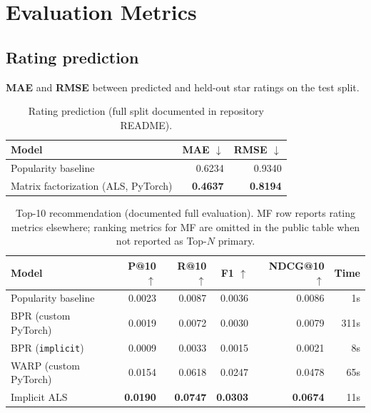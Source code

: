 \documentclass[sigconf,nonacm]{acmart}
\begin{document}
\section{Evaluation Metrics}
\label{sec:metrics}
\subsection{Rating prediction}
\textbf{MAE} and \textbf{RMSE} between predicted and held-out star ratings on the test split.

\begin{table}[t]
  \caption{Rating prediction (full split documented in repository README).}
  \label{tab:rating}
  \centering
  \begin{tabular}{lrr}
    \toprule
    Model & MAE $\downarrow$ & RMSE $\downarrow$ \\
    \midrule
    Popularity baseline & 0.6234 & 0.9340 \\
    Matrix factorization (ALS, PyTorch) & \textbf{0.4637} & \textbf{0.8194} \\
    \bottomrule
  \end{tabular}
\end{table}

\begin{table}[t]
  \caption{Top-10 recommendation (documented full evaluation). MF row reports rating metrics elsewhere; ranking metrics for MF are omitted in the public table when not reported as Top-$N$ primary.}
  \label{tab:rank}
  \centering
  \footnotesize
  \setlength{\tabcolsep}{4pt}
  \begin{tabular}{@{}lrrrrr@{}}
    \toprule
    Model & P@10 $\uparrow$ & R@10 $\uparrow$ & F1 $\uparrow$ & NDCG@10 $\uparrow$ & Time \\
    \midrule
    Popularity baseline & 0.0023 & 0.0087 & 0.0036 & 0.0086 & 1s \\
    BPR (custom PyTorch) & 0.0019 & 0.0072 & 0.0030 & 0.0079 & 311s \\
    BPR (\texttt{implicit}) & 0.0009 & 0.0033 & 0.0015 & 0.0021 & 8s \\
    WARP (custom PyTorch) & 0.0154 & 0.0618 & 0.0247 & 0.0478 & 65s \\
    Implicit ALS & \textbf{0.0190} & \textbf{0.0747} & \textbf{0.0303} & \textbf{0.0674} & 11s \\
    \bottomrule
  \end{tabular}
\end{table}
\end{document}
